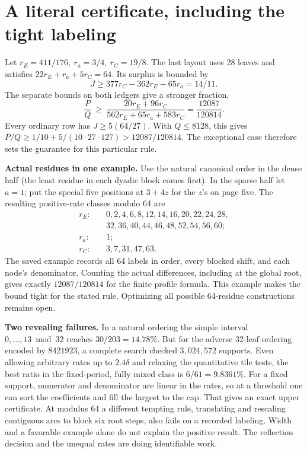 \documentclass[12pt,letterpaper]{article}
\newcommand{\para}[1]{\par\medskip\noindent\textbf{#1}\quad}
\newcommand{\pagepart}[1]{\clearpage\section{#1}}
\begin{document}
\pagepart{A literal certificate, including the tight labeling}
Let \(r_E=411/176,\ r_a=3/4,\ r_C=19/8\). The last layout uses 28 leaves and satisfies \(22r_E+r_a+5r_C=64\). Its surplus is bounded by
\[
        J\ge 377r_C-362r_E-65r_a=14/11 .
\]
The separate bounds on both ledgers give a stronger fraction,
\[
  \frac PQ\ \ge\
  \frac{20r_E+96r_C}{562r_E+65r_a+583r_C}
  =\frac{12087}{120814}.
\]
Every ordinary row has \(J\ge5(64/27)\). With \(Q\le8128\), this gives \(P/Q\ge1/10+5/(10\cdot27\cdot127)>12087/120814\). The exceptional case therefore sets the guarantee for this particular rule.

\para{Actual residues in one example.} Use the natural canonical order in the dense half (the least residue in each dyadic block comes first). In the sparse half let \(a=1\); put the special five positions at \(3+4z\) for the \(z\)'s on page five. The resulting positive-rate classes modulo 64 are
\[
\begin{aligned}
r_E:\quad &0,2,4,6,8,12,14,16,20,22,24,28,\\[-2pt]
           &32,36,40,44,46,48,52,54,56,60;\\
r_a:\quad &1;\\
r_C:\quad &3,7,31,47,63.
\end{aligned}
\]
The saved example records all 64 labels in order, every blocked shift, and each node's denominator. Counting the actual differences, including at the global root, gives exactly \(12087/120814\) for the finite profile formula. This example makes the bound tight for the stated rule. Optimizing all possible 64-residue constructions remains open.

\para{Two revealing failures.} In a natural ordering the simple interval \(0,\ldots,13\bmod32\) reaches \(30/203=14.78\%\). But for the adverse 32-leaf ordering encoded by \(8421923\), a complete search checked \(3{,}024{,}572\) supports. Even allowing arbitrary rates up to \(2.4\delta\) and relaxing the quantitative tile tests, the best ratio in the fixed-period, fully mixed class is \(6/61=9.8361\%\). For a fixed support, numerator and denominator are linear in the rates, so at a threshold one can sort the coefficients and fill the largest to the cap. That gives an exact upper certificate. At modulus 64 a different tempting rule, translating and rescaling contiguous arcs to block six root steps, also fails on a recorded labeling. Width and a favorable example alone do not explain the positive result. The reflection decision and the unequal rates are doing identifiable work.
\end{document}
